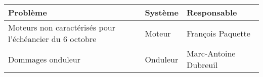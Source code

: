 \begin{tabularx}{\linewidth}{
    |>{\hsize=1.7\hsize}X|%
    >{\hsize=0.5\hsize}X|%
    >{\hsize=0.8\hsize}X|%
  }
    \hline
    \textbf{Problème} & \textbf{Système} & \textbf{Responsable} \\\hline
    Moteurs non caractérisés pour l'échéancier du 6 octobre & Moteur & François Paquette \\\hline
    Dommages onduleur & Onduleur & Marc-Antoine Dubreuil\\\hline
\end{tabularx}
    
    
